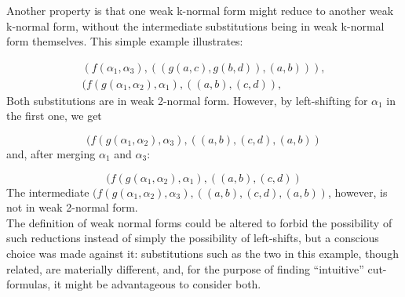 \documentclass[a4paper, 11pt]{report}
\begin{document}
Another property is that one weak k-normal form might reduce to another weak k-normal form, without the intermediate substitutions being in weak k-normal form themselves. This simple example illustrates:

$$
  \begin{array}{l}
    (f(\alpha_1,\alpha_3), ((g(a,c),g(b,d)), (a,b))),\\
    (f(g(\alpha_1,\alpha_2),\alpha_1), ((a,b), (c,d)),
  \end{array}
$$
\noindent
Both substitutions are in weak 2-normal form. However, by left-shifting for $\alpha_1$ in the first one, we get

$$
  (f(g(\alpha_1,\alpha_2),\alpha_3), ((a,b), (c,d) , (a,b))
$$
\noindent
and, after merging $\alpha_1$ and $\alpha_3$:

$$
  (f(g(\alpha_1,\alpha_2),\alpha_1), ((a,b), (c,d))
$$
\noindent
The intermediate $(f(g(\alpha_1,\alpha_2),\alpha_3), ((a,b), (c,d) , (a,b))$, however, is not in weak 2-normal form.\\

The definition of weak normal forms could be altered to forbid the possibility of such reductions instead of simply the possibility of left-shifts, but a conscious choice was made against it: substitutions such as the two in this example, though related, are materially different, and, for the purpose of finding ``intuitive'' cut-formulas, it might be advantageous to consider both.



\end{document}
